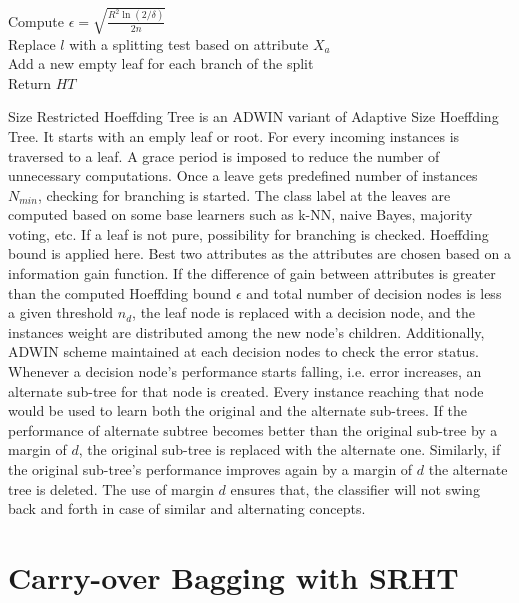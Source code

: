 \begin{algorithm}[htbp]
{{{{                    Compute $\epsilon = \sqrt{\frac{R^2 \ln(2/\delta)}{2n}}$   \\
                    
                     {
                         {
                            Replace $l$ with a splitting test based on attribute $X_a$ \\
                            Add a new empty leaf for each branch of the split \\
                        }
                    }
                }
            }
        }
    Return $HT$
    }
\end{algorithm}

Size Restricted Hoeffding Tree is an ADWIN variant of Adaptive Size Hoeffding Tree. It starts with an emply leaf or root. For every incoming instances is traversed to a leaf. A grace period is imposed to reduce the number of unnecessary computations. Once a leave gets predefined number of instances $N_{min}$, checking for branching is started. The class label at the leaves are computed based on some base learners such as k-NN, naive Bayes, majority voting, etc. If a leaf is not pure, possibility for branching is checked. Hoeffding bound is applied here. Best two attributes as the attributes are chosen based on a information gain function. If the difference of gain between attributes is greater than the computed Hoeffding bound $\epsilon$ and total number of decision nodes is less a given threshold $n_d$, the leaf node is replaced with a decision node, and the instances weight are distributed among the new node's children. Additionally, ADWIN scheme maintained at each decision nodes to check the error status. Whenever a decision node's performance starts falling, i.e. error increases, an alternate sub-tree for that node is created. Every instance reaching that node would be used to learn both the original and the alternate sub-trees. If the performance of alternate subtree becomes better than the original sub-tree by a margin of $d$, the original sub-tree is replaced with the alternate one. Similarly, if the original sub-tree's performance improves again by a margin of $d$ the alternate tree is deleted. The use of margin $d$ ensures that, the classifier will not swing back and forth in case of similar and alternating concepts.

\section{Carry-over Bagging with SRHT}

